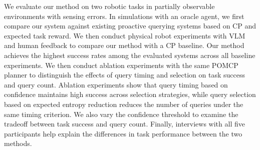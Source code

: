 
We evaluate our method on two robotic tasks in partially observable environments with sensing errors. In simulations with an oracle agent, we first compare our system against existing proactive querying systems based on CP and expected task reward. We then conduct physical robot experiments with VLM and human feedback to compare our method with a CP baseline. Our method achieves the highest success rates among the evaluated systems across all baseline experiments. We then conduct ablation experiments with the same POMCP planner to distinguish the effects of query timing and selection on task success and query count. Ablation experiments show that query timing based on confidence maintains high success across selection strategies, while query selection based on expected entropy reduction reduces the number of queries under the same timing criterion. We also vary the confidence threshold to examine the tradeoff between task success and query count. Finally, interviews with all five participants help explain the differences in task performance between the two methods.

